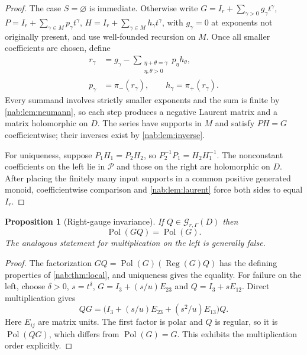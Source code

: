 \documentclass[11pt,letterpaper]{article}
\newtheorem{proposition}[proposition]{Proposition}
\theoremstyle{definition}
\theoremstyle{remark}
\newcommand{\GG}{\mathscr G_{r,\Gamma}}
\newcommand{\Pol}{\operatorname{Pol}}
\newcommand{\Reg}{\operatorname{Reg}}
\newcommand{\PP}{\mathcal P}
\numberwithin{equation}{section}
\begin{document}
\begin{proof}
The case $S=\varnothing$ is immediate. Otherwise write
$G=I_r+\sum_{\gamma>0}g_\gamma t^\gamma$,
$P=I_r+\sum_{\gamma\in M}p_\gamma t^\gamma$,
$H=I_r+\sum_{\gamma\in M}h_\gamma t^\gamma$, with $g_\gamma=0$ at exponents
not originally present, and use well-founded recursion on $M$. Once all
smaller coefficients are chosen, define
\begin{align}
 r_\gamma&=g_\gamma-
   \sum_{\substack{\eta+\theta=\gamma\\ \eta,\theta>0}}p_\eta h_\theta,
   \label{nab:eq:factorrec1}\\
 p_\gamma&=\pi_-(r_\gamma),\qquad h_\gamma=\pi_+(r_\gamma).
   \label{nab:eq:factorrec2}
\end{align}
Every summand involves strictly smaller exponents and the sum is finite by
\cref{nab:lem:neumann}, so each step produces a negative Laurent matrix and a
matrix holomorphic on $D$. The series have supports in $M$ and satisfy $PH=G$
coefficientwise; their inverses exist by \cref{nab:lem:inverse}.

For uniqueness, suppose $P_1H_1=P_2H_2$, so $P_2^{-1}P_1=H_2H_1^{-1}$. The
nonconstant coefficients on the left lie in $\PP$ and those on the right are
holomorphic on $D$. After placing the finitely many input supports in a common
positive generated monoid, coefficientwise comparison and
\cref{nab:lem:laurent} force both sides to equal $I_r$.
\end{proof}

\begin{proposition}[Right-gauge invariance]\label{nab:prop:rightgauge}
If $Q\in\GG(D)$ then
\begin{equation}\label{nab:eq:rightgauge}
 \Pol(GQ)=\Pol(G).
\end{equation}
The analogous statement for multiplication on the left is generally false.
\end{proposition}

\begin{proof}
The factorization $GQ=\Pol(G)(\Reg(G)Q)$ has the defining properties of
\cref{nab:thm:local}, and uniqueness gives the equality. For failure on the
left, choose $\delta>0$, $s=t^\delta$, $G=I_3+(s/u)E_{23}$ and
$Q=I_3+sE_{12}$. Direct multiplication gives
\[
 QG=\bigl(I_3+(s/u)E_{23}+(s^2/u)E_{13}\bigr)Q.
\]
Here $E_{ij}$ are matrix units. The first factor is polar and $Q$ is regular,
so it is $\Pol(QG)$, which
differs from $\Pol(G)=G$. This exhibits the multiplication order explicitly.
\end{proof}
\end{document}
